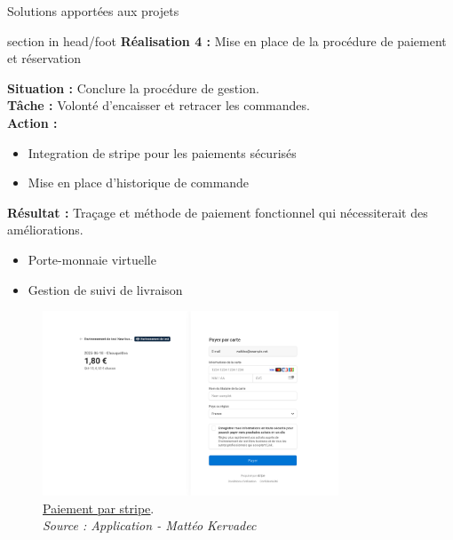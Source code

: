 \documentclass{beamer}
\begin{document}
\begin{frame}{Solutions apportées aux projets}
	\begin{beamercolorbox}[wd=\paperwidth,ht=1.5em,dp=0.5em,leftskip=0.5cm]{section in head/foot}
  		\large \textbf{Réalisation 4 :} \normalsize Mise en place de la procédure de paiement et réservation
	\end{beamercolorbox}
	\vspace{0.5em}
	\begin{center}
		 {	
	  		\begin{minipage}{0.9\textwidth}
  				\textbf{Situation :} Conclure la procédure de gestion.\\
  				\textbf{Tâche :} Volonté d'encaisser et retracer les commandes.\\
  				\textbf{Action :}
  				\begin{itemize}
  					\item Integration de stripe pour les paiements sécurisés
  					\item Mise en place d'historique de commande
  				\end{itemize}
				\textbf{Résultat :} Traçage et méthode de paiement fonctionnel qui nécessiterait des améliorations.
				\begin{itemize}
					\item Porte-monnaie virtuelle
					\item Gestion de suivi de livraison
				\end{itemize}
  			\end{minipage}
  		}
  		
  		\only<2> {
			\begin{figure}[t]
  				\includegraphics[height=5.5cm]{../img/localhost/stripe.png}
				\caption{	
					\centering			
  					\href{https://github.com/Matteo-K/Soutenance_E-delic/blob/main/img/maquette/crud_produit.png}{\underline{Paiement par stripe}}.\\
  					\textit{Source : Application - Mattéo Kervadec}
				}
  				\label{fig:stripe}
  			\end{figure}
		}
		

\end{center}
\end{frame}
\end{document}

